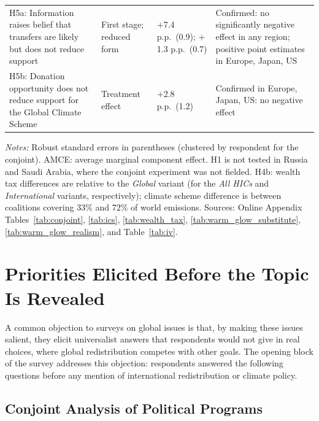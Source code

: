 \documentclass[12pt,english]{article}
\begin{document}
\begin{table}[!tbp]
\begin{tabularx}{\textwidth}{@{}>{\raggedright\arraybackslash}p{4.3cm}>{\raggedright\arraybackslash}p{2.5cm}>{\raggedright\arraybackslash}p{2.9cm}>{\raggedright\arraybackslash}X@{}}
H5a: Information raises belief that transfers are likely but does not reduce support & First stage; reduced form & $+$7.4 p.p.\ (0.9); $+$1.3 p.p.\ (0.7) & Confirmed: no significantly negative effect in any region; positive point estimates in Europe, Japan, US \\[2pt]
H5b: Donation opportunity does not reduce support for the Global Climate Scheme & Treatment effect & $+$2.8 p.p.\ (1.2) & Confirmed in Europe, Japan, US: no negative effect \\
\bottomrule
\end{tabularx}
\begin{minipage}{\textwidth}
\vspace{3pt}
\footnotesize \textit{Notes:} Robust standard errors in parentheses (clustered by respondent for the conjoint). AMCE: average marginal component effect. H1 is not tested in Russia and Saudi Arabia, where the conjoint experiment was not fielded. H4b: wealth tax differences are relative to the \textit{Global} variant (for the \textit{All HICs} and \textit{International} variants, respectively); climate scheme difference is between coalitions covering 33\% and 72\% of world emissions. Sources: Online Appendix Tables~\ref{tab:conjoint}, \ref{tab:ics}, \ref{tab:wealth_tax}, \ref{tab:warm_glow_substitute}, \ref{tab:warm_glow_realism}, and Table~\ref{tab:iv}.
\end{minipage}
\end{table}

\section{Priorities Elicited Before the Topic Is Revealed}\label{sec:priorities}\label{sec:salience}

A common objection to surveys on global issues is that, by making these issues salient, they elicit universalist answers that respondents would not give in real choices, where global redistribution competes with other goals. The opening block of the survey addresses this objection: respondents answered the following questions before any mention of international redistribution or climate policy.

\subsection{Conjoint Analysis of Political Programs}\label{subsec:conjoint}
\end{document}
